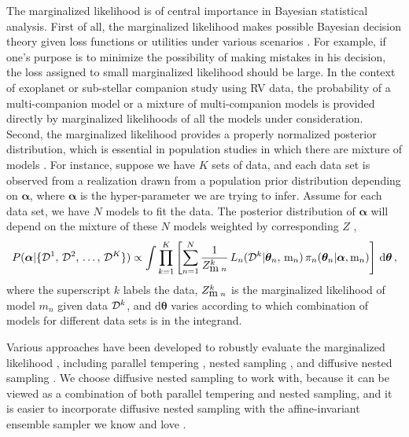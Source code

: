 \documentclass[letterpaper, preprint]{aastex}
\newcommand{\bth} {\boldsymbol \theta}
\newcommand{\bal} {\boldsymbol \alpha}
\newcommand{\md}{\mathrm{d}}
\begin{document}
The marginalized likelihood is of central importance in Bayesian statistical analysis. First of all, the marginalized likelihood makes possible Bayesian decision theory given loss functions or utilities under various scenarios \citep{kass95a, jaynes03a}. For example, if one's purpose is to minimize the possibility of making mistakes in his decision, the loss assigned to small marginalized likelihood should be large. In the context of exoplanet or sub-stellar companion study using RV data, the probability of a multi-companion model or a mixture of multi-companion models is provided directly by marginalized likelihoods of all the models under consideration. Second, the marginalized likelihood provides a properly normalized posterior distribution, which is essential in population studies in which there are mixture of models \citep{gelman04a}. For instance, suppose we have $K$ sets of data, and each data set is observed from a realization drawn from a population prior distribution depending on $\bal$, where $\bal$ is the hyper-parameter we are trying to infer. Assume for each data set, we have $N$ models to fit the data. The posterior distribution of $\bal$ will depend on the mixture of these $N$ models weighted by corresponding $Z$ \citep{hogg10a},
\begin{equation}
P(\bal | \{ {\cal D}^1,\, {\cal D}^2,\,\ldots,\, {\cal D}^K \}) \propto \int \prod_{k=1}^K\left[ \sum_{n=1}^{N} \frac{1}{Z_{ {\mbox m}\;n}^k}\,L_n({\cal D}^k| \bth_n,\, {\mbox m}_n )\,\pi_n(\bth_n | \bal, {\mbox m}_n) \right]\,\md\bth\, ,
\label{eq:model-mixture}
\end{equation}
where the superscript $k$ labels the data, $Z_{ {\mbox m}\;n}^k$ is the marginalized likelihood of model $m_n$ given data ${\cal D}^k$, and $\md\bth$ varies according to which combination of models for different data sets is in the integrand.

Various approaches have been developed to robustly evaluate the marginalized likelihood \citep{cameron13a}, including parallel tempering \citep{ford07a}, nested sampling \citep{skilling06a, feroz08a}, and diffusive nested sampling \citep{brewer11a}. We choose diffusive nested sampling to work with, because it can be viewed as a combination of both parallel tempering and nested sampling, and it is easier to incorporate diffusive nested sampling with the affine-invariant ensemble sampler we know and love \citep{goodman10a, hou12a, foreman-mackey13a}.
\end{document}
